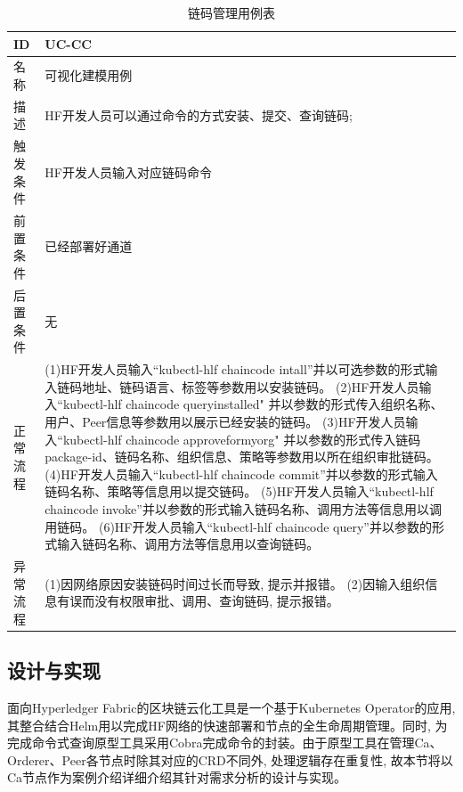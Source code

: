 {\footnotesize
\begin{longtable}[h]{m{60pt}|m{280pt}}
    \caption[链码管理用例表]{链码管理用例表} \label{cc_use_case} \\
        \hline  
        ID&UC-CC\\
        \hline
        名称&可视化建模用例\\
        \hline
        描述&HF开发人员可以通过命令的方式安装、提交、查询链码;\\
        \hline
        触发条件&HF开发人员输入对应链码命令\\
        \hline
        前置条件&已经部署好通道\\
        \hline
        后置条件&无\\
        \hline
        正常流程& (1)HF开发人员输入“kubectl-hlf chaincode intall”并以可选参数的形式输入链码地址、链码语言、标签等参数用以安装链码。
        \newline (2)HF开发人员输入“kubectl-hlf chaincode queryinstalled" 并以参数的形式传入组织名称、用户、Peer信息等参数用以展示已经安装的链码。
         \newline (3)HF开发人员输入“kubectl-hlf chaincode approveformyorg" 并以参数的形式传入链码package-id、链码名称、组织信息、策略等参数用以所在组织审批链码。
        \newline (4)HF开发人员输入“kubectl-hlf chaincode commit”并以参数的形式输入链码名称、策略等信息用以提交链码。
        \newline (5)HF开发人员输入“kubectl-hlf chaincode invoke”并以参数的形式输入链码名称、调用方法等信息用以调用链码。
        \newline (6)HF开发人员输入“kubectl-hlf chaincode query”并以参数的形式输入链码名称、调用方法等信息用以查询链码。\\
        \hline 
        异常流程& (1)因网络原因安装链码时间过长而导致, 提示并报错。
        \newline (2)因输入组织信息有误而没有权限审批、调用、查询链码, 提示报错。\\
        \hline
    \end{longtable} 
}

\subsection{设计与实现}

面向Hyperledger Fabric的区块链云化工具是一个基于Kubernetes Operator的应用, 其整合结合Helm用以完成HF网络的快速部署和节点的全生命周期管理。同时, 为完成命令式查询原型工具采用Cobra\footnotemark[1]完成命令的封装。由于原型工具在管理Ca、Orderer、Peer各节点时除其对应的CRD不同外, 处理逻辑存在重复性, 故本节将以Ca节点作为案例介绍详细介绍其针对需求分析的设计与实现。

